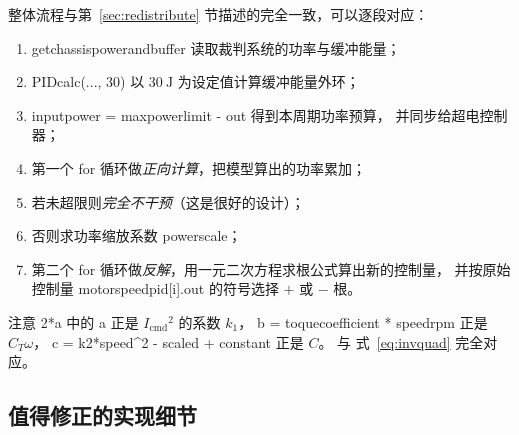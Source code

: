 \documentclass[cn,blue,11pt,device=normal]{elegantnote}
\newcommand{\code}[1]{{\ttfamily\small\def\_{\textunderscore\allowbreak}#1}}
\newcommand{\Icmd}{I_{\mathrm{cmd}}{}}
\newcommand{\CT}{C_{T}{}}
\newcommand{\fref}[1]{式~\eqref{#1}}
\begin{document}
整体流程与第~\ref{sec:redistribute} 节描述的完全一致，可以逐段对应：

\begin{enumerate}
  \item \code{get\_chassis\_power\_and\_buffer} 读取裁判系统的功率与缓冲能量；
  \item \code{PID\_calc(..., 30)} 以 $30\ \mathrm{J}$ 为设定值计算缓冲能量外环；
  \item \code{input\_power = max\_power\_limit - out} 得到本周期功率预算，
  并同步给超电控制器；
  \item 第一个 \code{for} 循环做\emph{正向计算}，把模型算出的功率累加；
  \item 若未超限则\emph{完全不干预}（这是很好的设计）；
  \item 否则求功率缩放系数 \code{power\_scale}；
  \item 第二个 \code{for} 循环做\emph{反解}，用一元二次方程求根公式算出新的控制量，
  并按原始控制量 \code{motor\_speed\_pid[i].out} 的符号选择 $+$ 或 $-$ 根。
\end{enumerate}

注意 \code{2*a} 中的 \code{a} 正是 $\Icmd^2$ 的系数 $k_1$，
\code{b = toque\_coefficient * speed\_rpm} 正是 $\CT\omega$，
\code{c = k2*speed\string^2 - scaled + constant} 正是 $C$。
与 \fref{eq:invquad} 完全对应。

\subsection{值得修正的实现细节}
\end{document}
